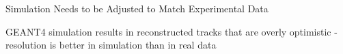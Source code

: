 \documentclass[aspectratio=169]{beamer}
\begin{document}
\begin{frame}{Simulation Needs to be Adjusted to Match Experimental Data}


GEANT4 simulation results in reconstructed tracks that are overly optimistic - resolution is better in simulation than in real data



\vspace{0.2cm}
\end{frame}
\end{document}
